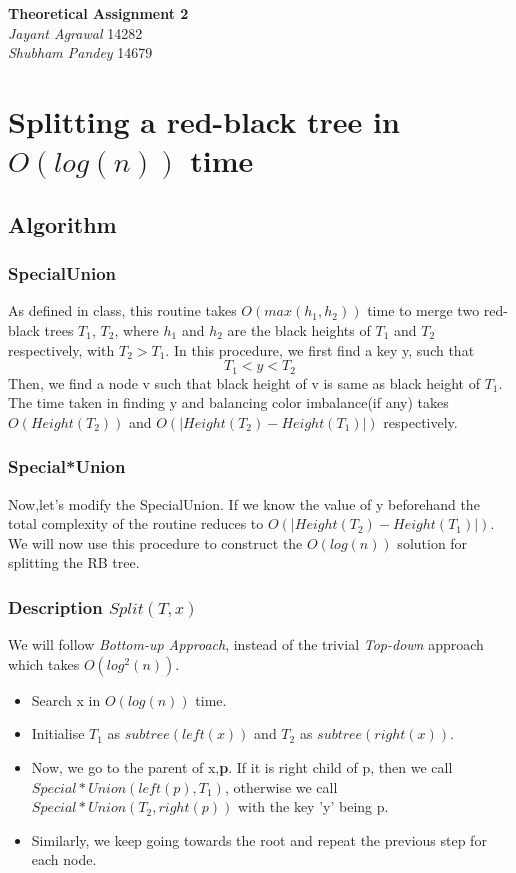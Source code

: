 \documentclass{article}
\begin{document}

\begin{center}
\textbf{\Large Theoretical Assignment 2} \\
\textit{\large Jayant Agrawal}         14282 \\
\textit{\large Shubham Pandey}         14679
\end{center}

\section{Splitting a red-black tree in $O(log(n))$ time}

\subsection{Algorithm}
\subsubsection{SpecialUnion}
As defined in class, this routine takes $O(max(h_1,h_2))$ time to merge two red-black trees $T_1$, $T_2$, where $h_1$ and $h_2$ are the black heights of $T_1$ and $T_2$ respectively, with $T_2 > T_1$. In this procedure, we first find a key y, such that 
$$ T_1 < y < T_2 $$ Then, we find a node v such that black height of v is same as black height of $T_1$.
The time taken in finding y and balancing color imbalance(if any) takes $O(Height(T_2))$ and $O(|Height(T_2)-Height(T_1)|)$ respectively.
\subsubsection{Special*Union}
Now,let's modify the SpecialUnion. If we know the value of y beforehand the total complexity of the routine reduces to $O(|Height(T_2)-Height(T_1)|)$. We will now use this procedure to construct the $O(log(n))$ solution for splitting the RB tree.

\subsubsection{Description $Split(T,x)$}
We will follow {\it Bottom-up Approach}, instead of the trivial {\it Top-down }approach which takes $O(log^{2}(n))$.
\begin{itemize}
\item Search x in $O(log(n))$ time.
\item Initialise $T_1$ as $subtree(left(x))$ and $T_2$ as $subtree(right(x))$.
\item Now, we go to the parent of x,\textbf{p}. If it is right child of p, then we call $Special*Union(left(p),T_1)$, otherwise we call $Special*Union(T_2,right(p))$ with the key 'y' being p.
\item Similarly, we keep going towards the root and repeat the previous step for each node.
\end{itemize}
\end{document}
